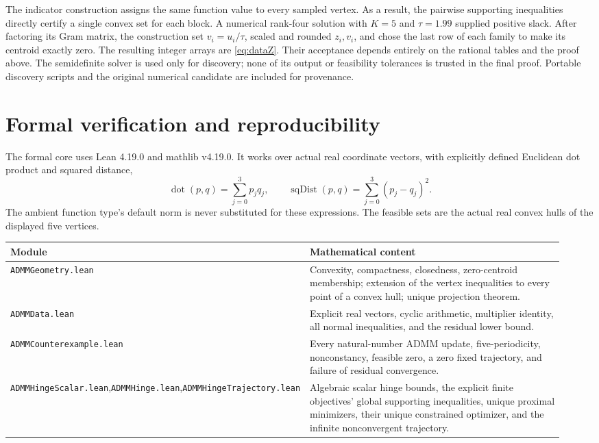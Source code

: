 \documentclass[11pt,a4paper]{article}
\theoremstyle{remark}
\begin{document}
The indicator construction assigns the same function value to every sampled vertex. As a result, the pairwise supporting inequalities directly certify a single convex set for each block. A numerical rank-four solution with $K=5$ and $\tau=1.99$ supplied positive slack. After factoring its Gram matrix, the construction set $v_i=u_i/\tau$, scaled and rounded $z_i,v_i$, and chose the last row of each family to make its centroid exactly zero. The resulting integer arrays are \eqref{eq:dataZ}. Their acceptance depends entirely on the rational tables and the proof above. The semidefinite solver is used only for discovery; none of its output or feasibility tolerances is trusted in the final proof. Portable discovery scripts and the original numerical candidate are included for provenance.

\section{Formal verification and reproducibility}\label{sec:formal}
The formal core uses Lean 4.19.0 and mathlib v4.19.0. It works over actual real coordinate vectors, with explicitly defined Euclidean dot product and squared distance,
\[
\operatorname{dot}(p,q)=\sum_{j=0}^3p_jq_j,
\qquad\operatorname{sqDist}(p,q)=\sum_{j=0}^3(p_j-q_j)^2.
\]
The ambient function type's default norm is never substituted for these expressions. The feasible sets are the actual real convex hulls of the displayed five vertices.

\begin{center}
\begin{tabular}{@{}p{0.31\linewidth}p{0.63\linewidth}@{}}
\toprule
Module & Mathematical content\\\midrule
\texttt{ADMMGeometry.lean} & Convexity, compactness, closedness, zero-centroid membership; extension of the vertex inequalities to every point of a convex hull; unique projection theorem.\\[4pt]
\texttt{ADMMData.lean} & Explicit real vectors, cyclic arithmetic, multiplier identity, all normal inequalities, and the residual lower bound.\\[4pt]
\texttt{ADMMCounterexample.lean} & Every natural-number ADMM update, five-periodicity, nonconstancy, feasible zero, a zero fixed trajectory, and failure of residual convergence.\\[4pt]
\texttt{ADMMHingeScalar.lean},\newline\texttt{ADMMHinge.lean},\newline\texttt{ADMMHingeTrajectory.lean} & Algebraic scalar hinge bounds, the explicit finite objectives' global supporting inequalities, unique proximal minimizers, their unique constrained optimizer, and the infinite nonconvergent trajectory.\\\bottomrule
\end{tabular}
\end{center}
\end{document}
